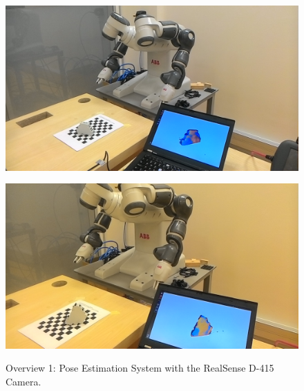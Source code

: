 \begin{figure}[htp]
\begin{center}
{
  \includegraphics[clip,width=0.8\columnwidth]{realnew/2.jpg}
}
\end{center}
\begin{center}
{
  \includegraphics[clip,width=0.8\columnwidth]{realnew/3.jpg}
}
\end{center}

\caption{Overview 1: Pose Estimation System with the RealSense D-415 Camera.}
\label{mami1}
\end{figure}


